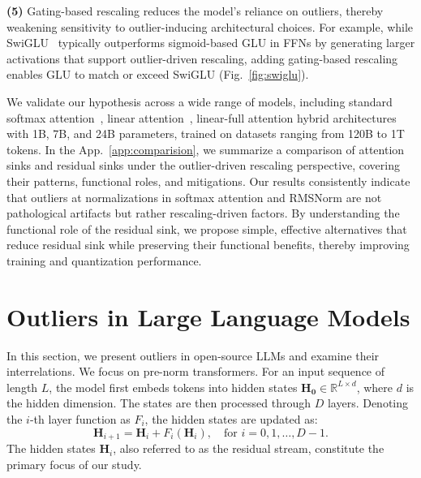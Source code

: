 \documentclass{article} %
\begin{document}
\textbf{(5)} Gating-based rescaling reduces the model’s reliance on outliers, thereby weakening sensitivity to outlier-inducing architectural choices. 
For example, while SwiGLU~\citep{shazeer2020glu} typically outperforms sigmoid-based GLU in FFNs by generating larger activations that support outlier-driven rescaling, adding gating-based rescaling enables GLU to match or exceed SwiGLU (Fig.~\ref{fig:swiglu}).

We validate our hypothesis across a wide range of models, including standard softmax attention~\citep{vaswani2017attention}, linear attention~\citep{yang2024gated}, linear-full attention hybrid architectures with 1B, 7B, and 24B parameters, trained on datasets ranging from 120B to 1T tokens. 
In the App.~\ref{app:comparision}, we summarize a comparison of attention sinks and residual sinks under the outlier-driven rescaling perspective, covering their patterns, functional roles, and mitigations.
Our results consistently indicate that outliers at normalizations in softmax attention and RMSNorm are not pathological artifacts but rather rescaling-driven factors.
By understanding the functional role of the residual sink, we propose simple, effective alternatives that reduce residual sink while preserving their functional benefits, thereby improving training and quantization performance.

\section{Outliers in Large Language Models}


In this section, we present outliers in open-source LLMs and examine their interrelations. 
We focus on pre-norm transformers.
For an input sequence of length \(L\), the model first embeds tokens into hidden states \(\mathbf{H_0} \in \mathbb{R}^{L \times d}\), where \(d\) is the hidden dimension. The states are then processed through \(D\) layers. Denoting the \(i\)-th layer function as \(F_i\), the hidden states are updated as:
\[
\mathbf{H}_{i+1} = \mathbf{H}_i + F_i(\mathbf{H}_i), \quad \text{for } i = 0, 1, \dots, D-1.
\]
The hidden states \(\mathbf{H}_i\), also referred to as the residual stream, constitute the primary focus of our study.
\end{document}
